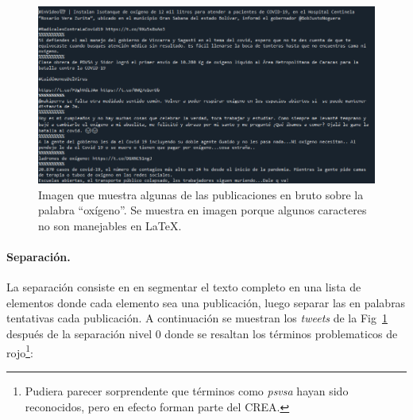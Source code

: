 \begin{figure}[h]
	\centering
	\includegraphics[width=0.95\linewidth]{img/tweets_raw}
	\caption{Imagen que muestra algunas de las publicaciones en bruto sobre la palabra ``oxígeno''. Se muestra en imagen porque algunos caracteres no son manejables en \LaTeX.}
	\label{fig:tweets_raw}
\end{figure}

\paragraph{Separación.} La separación consiste en en segmentar el texto completo en una lista de elementos donde cada elemento sea una publicación, luego separar las en palabras tentativas cada publicación. A continuación se muestran los \textit{tweets} de la Fig~\ref{fig:tweets_raw} después de la separación nivel 0 donde se resaltan los términos problematicos de rojo\footnote{Pudiera parecer sorprendente que términos como \textit{psvsa} hayan sido reconocidos, pero en efecto forman parte del CREA.}:

